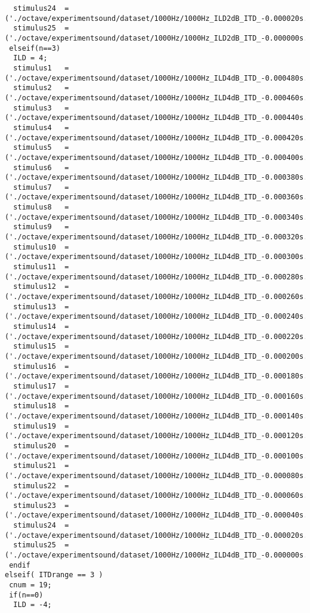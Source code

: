 {\begin{verbatim}
  stimulus24  =('./octave/experimentsound/dataset/1000Hz/1000Hz_ILD2dB_ITD_-0.000020s.wav');
  stimulus25  =('./octave/experimentsound/dataset/1000Hz/1000Hz_ILD2dB_ITD_-0.000000s.wav');
 elseif(n==3)
  ILD = 4;
  stimulus1   =('./octave/experimentsound/dataset/1000Hz/1000Hz_ILD4dB_ITD_-0.000480s.wav');
  stimulus2   =('./octave/experimentsound/dataset/1000Hz/1000Hz_ILD4dB_ITD_-0.000460s.wav');
  stimulus3   =('./octave/experimentsound/dataset/1000Hz/1000Hz_ILD4dB_ITD_-0.000440s.wav');
  stimulus4   =('./octave/experimentsound/dataset/1000Hz/1000Hz_ILD4dB_ITD_-0.000420s.wav');
  stimulus5   =('./octave/experimentsound/dataset/1000Hz/1000Hz_ILD4dB_ITD_-0.000400s.wav');
  stimulus6   =('./octave/experimentsound/dataset/1000Hz/1000Hz_ILD4dB_ITD_-0.000380s.wav');
  stimulus7   =('./octave/experimentsound/dataset/1000Hz/1000Hz_ILD4dB_ITD_-0.000360s.wav');
  stimulus8   =('./octave/experimentsound/dataset/1000Hz/1000Hz_ILD4dB_ITD_-0.000340s.wav');
  stimulus9   =('./octave/experimentsound/dataset/1000Hz/1000Hz_ILD4dB_ITD_-0.000320s.wav');
  stimulus10  =('./octave/experimentsound/dataset/1000Hz/1000Hz_ILD4dB_ITD_-0.000300s.wav');
  stimulus11  =('./octave/experimentsound/dataset/1000Hz/1000Hz_ILD4dB_ITD_-0.000280s.wav');
  stimulus12  =('./octave/experimentsound/dataset/1000Hz/1000Hz_ILD4dB_ITD_-0.000260s.wav');
  stimulus13  =('./octave/experimentsound/dataset/1000Hz/1000Hz_ILD4dB_ITD_-0.000240s.wav');
  stimulus14  =('./octave/experimentsound/dataset/1000Hz/1000Hz_ILD4dB_ITD_-0.000220s.wav');
  stimulus15  =('./octave/experimentsound/dataset/1000Hz/1000Hz_ILD4dB_ITD_-0.000200s.wav');
  stimulus16  =('./octave/experimentsound/dataset/1000Hz/1000Hz_ILD4dB_ITD_-0.000180s.wav');
  stimulus17  =('./octave/experimentsound/dataset/1000Hz/1000Hz_ILD4dB_ITD_-0.000160s.wav');
  stimulus18  =('./octave/experimentsound/dataset/1000Hz/1000Hz_ILD4dB_ITD_-0.000140s.wav');
  stimulus19  =('./octave/experimentsound/dataset/1000Hz/1000Hz_ILD4dB_ITD_-0.000120s.wav');
  stimulus20  =('./octave/experimentsound/dataset/1000Hz/1000Hz_ILD4dB_ITD_-0.000100s.wav');
  stimulus21  =('./octave/experimentsound/dataset/1000Hz/1000Hz_ILD4dB_ITD_-0.000080s.wav');
  stimulus22  =('./octave/experimentsound/dataset/1000Hz/1000Hz_ILD4dB_ITD_-0.000060s.wav');
  stimulus23  =('./octave/experimentsound/dataset/1000Hz/1000Hz_ILD4dB_ITD_-0.000040s.wav');
  stimulus24  =('./octave/experimentsound/dataset/1000Hz/1000Hz_ILD4dB_ITD_-0.000020s.wav');
  stimulus25  =('./octave/experimentsound/dataset/1000Hz/1000Hz_ILD4dB_ITD_-0.000000s.wav');
 endif
elseif( ITDrange == 3 )
 cnum = 19;
 if(n==0)
  ILD = -4;

\end{verbatim}}
